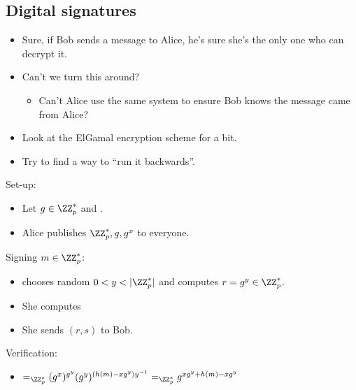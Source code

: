\subsection{Digital signatures}

\begin{frame}
  \begin{idea}
    \begin{itemize}
      \item Sure, if Bob sends a message to Alice, he's sure she's the only one
        who can decrypt it.

        \pause{}

      \item Can't we turn this around?
        \begin{itemize}
          \item Can't Alice use the same system to ensure Bob knows the message
            came from Alice?
        \end{itemize}
    \end{itemize}
  \end{idea}

  \pause{}

  \begin{exercise}
    \begin{itemize}
      \item Look at the ElGamal encryption scheme for a bit.
      \item Try to find a way to \enquote{run it backwards}.
    \end{itemize}
  \end{exercise}
\end{frame}

\begin{frame}
  \footnotesize
  \begin{definition}
    Set-up:
    \begin{itemize}
      \item Let \(g\in \ZZ_p^*\) and .
      \item Alice publishes \(\ZZ_p^*, g, g^x\) to everyone.
    \end{itemize}
    Signing \(m\in \ZZ_p^*\):
    \begin{itemize}
      \item {} chooses random \(0 < y < |\ZZ_p^*|\) and computes 
        \(r = g^y\in \ZZ_p^*\).
      \item She computes 
      \item She sends \((r, s)\) to Bob.
    \end{itemize}
    Verification:
    \begin{itemize}
      \item {}\( =_{\ZZ_p^*}
          (g^x)^{g^y} (g^y)^{(h(m) - xg^y)y^{-1}} =_{\ZZ_p^*}
          g^{xg^y + h(m) - xg^y}\)
    \end{itemize}
  \end{definition}
\end{frame}

